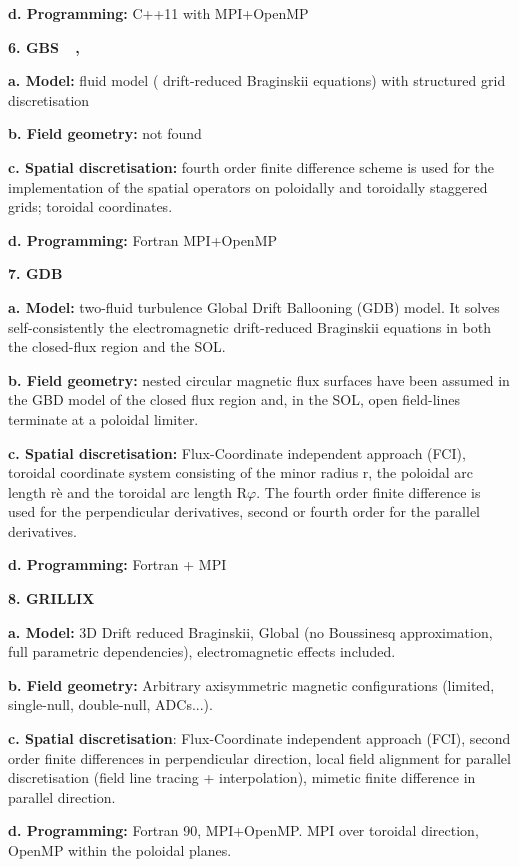 \documentclass{article}
\begin{document}
\textbf{d. Programming: }C++11 with MPI+OpenMP

{ \textbf{6. GBS }}{~\cite{ref [14]}}{ \textbf{, 
}}{~\cite{ref [15]}}

\textbf{a. Model:} fluid model ({ drift-reduced}{\Large{}{  
}}Braginskii equations) with structured grid discretisation

\textbf{b. Field geometry:} not found

\textbf{c. Spatial discretisation: }fourth order finite difference scheme is used 
for the implementation of the spatial operators on poloidally and toroidally staggered 
grids; toroidal coordinates.

\textbf{d. Programming: }Fortran  MPI+OpenMP

{ \textbf{7. GDB }}{~\cite{ref [16]}}

\textbf{a. Model: }two-fluid turbulence Global Drift Ballooning (GDB) model. It 
solves self-consistently the electromagnetic drift-reduced Braginskii equations 
in both the closed-flux region and the SOL.

\textbf{b. Field geometry: }nested circular magnetic flux surfaces have been assumed 
in the GBD model of the closed flux region and, in the SOL, open field-lines terminate 
at a poloidal limiter.

\textbf{c. Spatial discretisation:} Flux-Coordinate independent approach (FCI), 
toroidal coordinate system consisting of the minor radius r, the poloidal arc length 
rè and the toroidal arc length R$\varphi$. The fourth order finite difference 
is used for the perpendicular derivatives, second or fourth order for the parallel 
derivatives.

\textbf{d. Programming: }Fortran + MPI

{ \textbf{8. GRILLIX }}{~\cite{ref [17]}}

\textbf{a. Model:} 3D Drift reduced Braginskii, Global (no Boussinesq approximation, 
full parametric dependencies), electromagnetic effects included.

\textbf{b. Field geometry:} Arbitrary axisymmetric magnetic configurations (limited, 
single-null, double-null, ADCs...).

\textbf{c. Spatial discretisation}: Flux-Coordinate independent approach (FCI), 
second order finite differences in perpendicular direction, local field alignment 
for parallel discretisation (field line tracing + interpolation), mimetic finite 
difference in parallel direction.

\textbf{d. Programming:} Fortran 90, MPI+OpenMP. MPI over toroidal direction, OpenMP 
within the poloidal planes.
\end{document}

